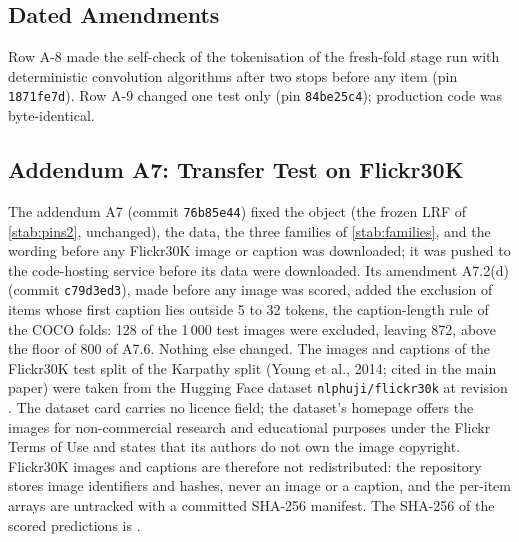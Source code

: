 \documentclass[journal,onecolumn]{IEEEtran}
\theoremstyle{plain}
\begin{document}
\subsection{Dated Amendments}
Row A-8 made the self-check of the tokenisation of the fresh-fold stage run with deterministic convolution algorithms after two stops before any item (pin \texttt{1871fe7d}).
Row A-9 changed one test only (pin \texttt{84be25c4}); production code was byte-identical.

\subsection{Addendum A7: Transfer Test on Flickr30K}\label{sup:a7}
The addendum A7 (commit \texttt{76b85e44}) fixed the object (the frozen LRF of \cref{stab:pins2}, unchanged), the data, the three families of \cref{stab:families}, and the wording
before any Flickr30K image or caption was downloaded; it was pushed to the code-hosting service before its data were downloaded.
Its amendment A7.2(d) (commit \texttt{c79d3ed3}), made before any image was scored, added the exclusion of items whose first caption lies outside 5 to 32 tokens, the caption-length rule of the
COCO folds: 128 of the 1\,000 test images were excluded, leaving 872, above the floor of 800 of A7.6. Nothing else changed.
The images and captions of the Flickr30K test split of the Karpathy split (Young et al., 2014; cited in the main paper) were taken from the Hugging Face dataset
\texttt{nlphuji/flickr30k} at revision \texttt{}.
The dataset card carries no licence field; the dataset's homepage offers the images for non-commercial research and educational purposes under the Flickr Terms of Use and states that its authors do not own the image copyright.
Flickr30K images and captions are therefore not redistributed: the repository stores image identifiers and hashes, never an image or a caption, and the per-item arrays are untracked with a committed SHA-256 manifest.
The SHA-256 of the scored predictions is \texttt{}.
\end{document}
